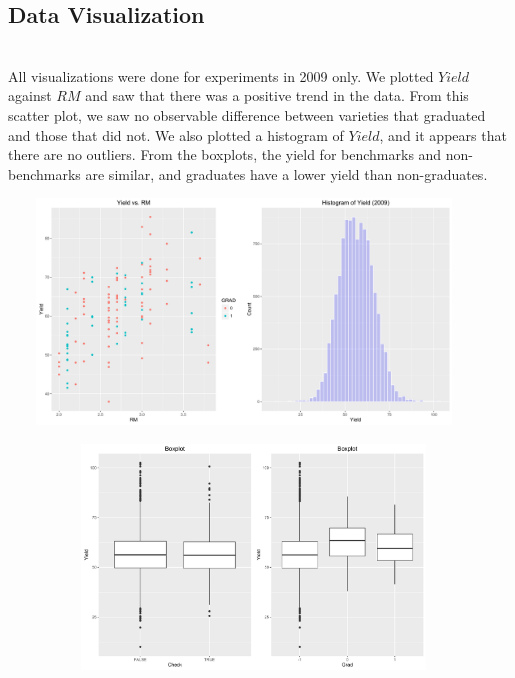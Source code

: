 \documentclass[psamsfonts]{amsart}
\begin{document}
\subsection*{Data Visualization}
\hfill \\

All visualizations were done for experiments in 2009 only. We plotted $Yield$ against $RM$ and saw that there was a positive trend in the data.  From this scatter plot, we saw no observable difference between varieties that graduated and those that did not. We also plotted a histogram of $Yield$, and it appears that there are no outliers. From the boxplots, the yield for benchmarks and non-benchmarks are similar, and graduates have a lower yield than non-graduates. \\
\begin{center}
\includegraphics[height = 6cm, width = 12.5cm]{plot1.pdf}
\end{center}
\begin{center}
\includegraphics[height = 6cm, width = 13cm]{boxplot.pdf}
\end{center}
\end{document}

